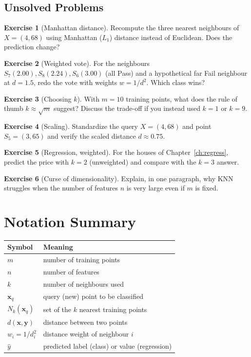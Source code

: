 \documentclass[11pt,a4paper]{report}
\theoremstyle{definition}
\newtheorem{exercise}{Exercise}[chapter]
\theoremstyle{remark}
\newcommand{\vx}{\mathbf{x}}
\newcommand{\vy}{\mathbf{y}}
\begin{document}
	\section{Unsolved Problems}
	\begin{exercise}[Manhattan distance]
		Recompute the three nearest neighbours of $X=(4,68)$ using Manhattan ($L_1$)
		distance instead of Euclidean. Does the prediction change?
	\end{exercise}
	\begin{exercise}[Weighted vote]
		For the neighbours $S_7(2.00),S_8(2.24),S_6(3.00)$ (all Pass) and a hypothetical
		far Fail neighbour at $d=1.5$, redo the vote with weights $w=1/d^2$. Which class
		wins?
	\end{exercise}
	\begin{exercise}[Choosing $k$]
		With $m=10$ training points, what does the rule of thumb $k\approx\sqrt{m}$
		suggest? Discuss the trade-off if you instead used $k=1$ or $k=9$.
	\end{exercise}
	\begin{exercise}[Scaling]
		Standardize the query $X=(4,68)$ and point $S_5=(3,65)$ and verify the scaled
		distance $d\approx0.75$.
	\end{exercise}
	\begin{exercise}[Regression, weighted]
		For the houses of Chapter~\ref{ch:regress}, predict the price with $k=2$
		(unweighted) and compare with the $k=3$ answer.
	\end{exercise}
	\begin{exercise}[Curse of dimensionality]
		Explain, in one paragraph, why KNN struggles when the number of features $n$ is
		very large even if $m$ is fixed.
	\end{exercise}
	
	\appendix
	\chapter{Notation Summary}
	\begin{center}
		\begin{tabular}{@{}ll@{}}
			\toprule
			Symbol & Meaning\\
			\midrule
			$m$ & number of training points\\
			$n$ & number of features\\
			$k$ & number of neighbours used\\
			$\vx_q$ & query (new) point to be classified\\
			$N_k(\vx_q)$ & set of the $k$ nearest training points\\
			$d(\vx,\vy)$ & distance between two points\\
			$w_i=1/d_i^2$ & distance weight of neighbour $i$\\
			$\hat y$ & predicted label (class) or value (regression)\\
			\bottomrule
		\end{tabular}
	\end{center}
	
\end{document}
